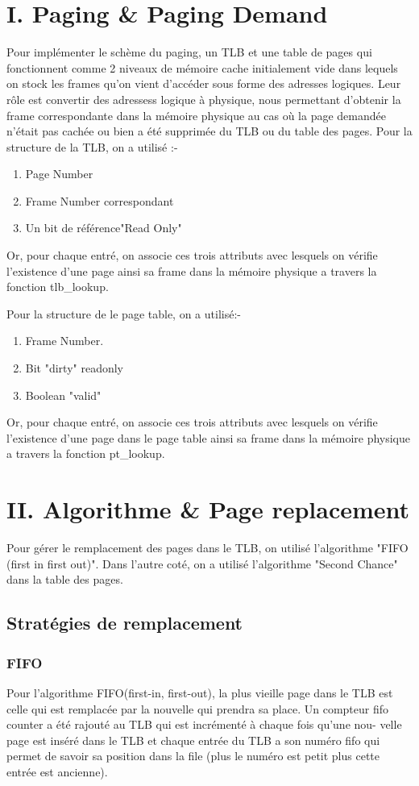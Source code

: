 \documentclass{article}
\begin{document}
\section*{I. Paging \& Paging Demand}
Pour implémenter le schème du paging, un TLB et une table de pages qui fonctionnent comme 2 niveaux de mémoire cache initialement vide dans lequels on stock les frames qu'on vient d'accéder sous forme des adresses logiques. Leur rôle est convertir des adressess logique à physique, nous permettant d'obtenir la frame correspondante dans la mémoire physique au cas où la page demandée n'était pas cachée ou bien a été supprimée du TLB ou du table des pages.
Pour la structure de la TLB, on a utilisé :-
\begin{enumerate}
	\item Page Number
	\item Frame Number correspondant
	\item Un bit de référence"Read Only" 
\end{enumerate}
Or, pour chaque entré, on associe ces trois attributs avec lesquels on vérifie l'existence d'une page ainsi sa frame dans la mémoire physique a travers la fonction tlb\_lookup. 

Pour la structure de le page table, on a utilisé:-
\begin{enumerate}
	\item Frame Number.
	\item Bit "dirty" readonly
	\item Boolean "valid"
\end{enumerate}
Or, pour chaque entré, on associe ces trois attributs avec lesquels on vérifie l'existence d'une page dans le page table ainsi sa frame dans la mémoire physique a travers la fonction pt\_lookup.


\section*{II. Algorithme \& Page replacement}

Pour gérer le remplacement des pages dans le TLB, on utilisé l'algorithme "FIFO (first in first out)".
Dans l'autre coté, on a utilisé l'algorithme "Second Chance" dans la table des pages.
\subsection{Stratégies de remplacement}
\subsubsection{FIFO}
Pour l’algorithme FIFO(first-in, first-out), la plus vieille page dans le TLB est celle qui est remplacée par la nouvelle qui prendra sa place. Un compteur
fifo counter a été rajouté au TLB qui est incrémenté à chaque fois qu’une nou-
velle page est inséré dans le TLB et chaque entrée du TLB a son numéro fifo
qui permet de savoir sa position dans la file (plus le numéro est petit plus cette entrée est ancienne).
\end{document}
